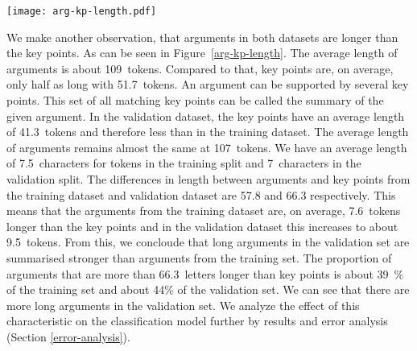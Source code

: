 \begin{figure*}
    \centering
    \texttt{[image: arg-kp-length.pdf]}
    \label{arg-kp-length}
    \caption{Differences in argument and key point lengths in the training and development set.}
\end{figure*}

We make another observation, that arguments in both datasets are longer than the key points. As can be seen in Figure~\ref{arg-kp-length}. 
The average length of arguments is about 109~tokens. Compared to that, key points are, on average, only half as long with 51.7~tokens.
An argument can be supported by several key points. This set of all matching key points can be called the summary of the given argument.  
In the validation dataset, the key points have an average length of 41.3~tokens and therefore less than in the training dataset. The average length of arguments remains almost the 
same at 107~tokens. 
We have an average length of 7.5~characters for tokens in the training split and 7~characters in the validation split. 
The differences in length between arguments and key points from the training dataset and validation dataset are 57.8 and 66.3 respectively. 
This means that the arguments from the training dataset are, on average, 7.6~tokens longer than the key points and in the validation dataset this increases to about 9.5~tokens. 
From this, we concloude that long arguments in the validation set are summarised stronger than arguments from the training set. 
The proportion of arguments that are more than 66.3~letters longer than key points is about 39~\% of the training set and about 44\% of the validation set. 
We can see that there are more long arguments in the validation set. 
We analyze the effect of this characteristic on the classification model further by results and error analysis (Section \ref{error-analysis}).
